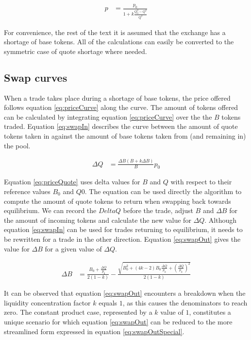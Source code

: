 \begin{align} \label{eq:priceQuote}
	p &= \frac{p_0}{ 1 + k \frac{Q_0^2 - Q^2}{Q^2}}
\end{align}

For convenience, the rest of the text it is assumed that the exchange has a shortage of base tokens. All of the calculations can easily be converted to the symmetric case of quote shortage where needed.

\subsection{Swap curves}
When a trade takes place during a shortage of base tokens, the price offered follows equation \ref{eq:priceCurve} along the curve. The amount of tokens offered can be calculated by integrating equation \ref{eq:priceCurve} over the the $B$ tokens traded. Equation \ref{eq:swapIn} describes the curve between the amount of quote tokens taken in against the amount of base tokens taken from (and remaining in) the pool.

\begin{align} \label{eq:swapIn}
	\Delta Q  &= \frac{\Delta B \left(B + k \Delta B \right)}{B} p_0
\end{align}

Equation \ref{eq:priceQuote} uses delta values for $B$ and $Q$ with respect to their reference values $B_0$ and $Q0$. The equation can be used directly the algorithm to compute the amount of quote tokens to return when swapping back towards equilibrium. We can record the $Delta Q$ before the trade, adjust $B$ and $\Delta B$ for the amount of incoming tokens and calculate the new value for $\Delta Q$. Although equation \ref{eq:swapIn} can be used for trades returning to equilibrium, it needs to be rewritten for a trade in the other direction. Equation \ref{eq:swapOut} gives the value for $\Delta B$ for a given value of $\Delta Q$.

\begin{align} \label{eq:swapOut}
	\Delta B &= \frac{B_0 + \frac{\Delta Q}{p_0}}{2\left(1-k\right)} - \frac{\sqrt{B_0^2 + \left(4k-2\right)B_0 \frac{\Delta Q}{p_0} + \left(\frac{\Delta Q}{p_0}\right)^2}}{2\left(1-k\right)}
\end{align}

It can be observed that equation \ref{eq:swapOut} encounters a breakdown when the liquidity concentration factor $k$ equals $1$, as this causes the denominators to reach zero. The constant product case, represented by a $k$ value of $1$, constitutes a unique scenario for which equation \ref{eq:swapOut} can be reduced to the more streamlined form expressed in equation \ref{eq:swapOutSpecial}.

